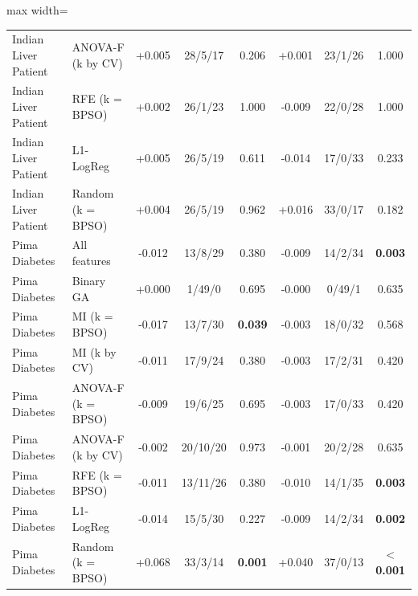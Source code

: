 \begin{table}[!t]
\begin{adjustbox}{max width=\linewidth}
\begin{tabular}{llcccccc}
Indian Liver Patient & ANOVA-F (k by CV) & +0.005 & 28/5/17 & 0.206 & +0.001 & 23/1/26 & 1.000 \\
Indian Liver Patient & RFE (k = BPSO) & +0.002 & 26/1/23 & 1.000 & -0.009 & 22/0/28 & 1.000 \\
Indian Liver Patient & L1-LogReg & +0.005 & 26/5/19 & 0.611 & -0.014 & 17/0/33 & 0.233 \\
Indian Liver Patient & Random (k = BPSO) & +0.004 & 26/5/19 & 0.962 & +0.016 & 33/0/17 & 0.182 \\
Pima Diabetes & All features & -0.012 & 13/8/29 & 0.380 & -0.009 & 14/2/34 & \textbf{0.003} \\
Pima Diabetes & Binary GA & +0.000 & 1/49/0 & 0.695 & -0.000 & 0/49/1 & 0.635 \\
Pima Diabetes & MI (k = BPSO) & -0.017 & 13/7/30 & \textbf{0.039} & -0.003 & 18/0/32 & 0.568 \\
Pima Diabetes & MI (k by CV) & -0.011 & 17/9/24 & 0.380 & -0.003 & 17/2/31 & 0.420 \\
Pima Diabetes & ANOVA-F (k = BPSO) & -0.009 & 19/6/25 & 0.695 & -0.003 & 17/0/33 & 0.420 \\
Pima Diabetes & ANOVA-F (k by CV) & -0.002 & 20/10/20 & 0.973 & -0.001 & 20/2/28 & 0.635 \\
Pima Diabetes & RFE (k = BPSO) & -0.011 & 13/11/26 & 0.380 & -0.010 & 14/1/35 & \textbf{0.003} \\
Pima Diabetes & L1-LogReg & -0.014 & 15/5/30 & 0.227 & -0.009 & 14/2/34 & \textbf{0.002} \\
Pima Diabetes & Random (k = BPSO) & +0.068 & 33/3/14 & \textbf{0.001} & +0.040 & 37/0/13 & \textbf{$<$0.001} \\
\bottomrule
\end{tabular}
\end{adjustbox}
\end{table}
